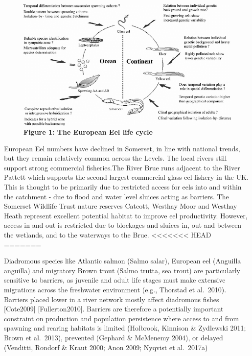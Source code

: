 \documentclass[]{article}
\begin{document}
\begin{figure}
\centering
\includegraphics{Eel-life-cycle.png}
\caption{\textbf{Figure 1: The European Eel life cycle}}
\end{figure}

European Eel numbers have declined in Somerset, in line with national
trends, but they remain relatively common across the Levels. The local
rivers still support strong commercial fisheries.The River Brue runs
adjacent to the River Pattett which supports the second largest
commercial glass eel fishery in the UK. This is thought to be primarily
due to restricted access for eels into and within the catchment - due to
flood and water level sluices acting as barriers. The Somerset Wildlife
Trust nature reserves Catcott, Westhay Moor and Westhay Heath represent
excellent potential habitat to improve eel productivity. However, access
in and out is restricted due to blockages and sluices in, out and
between the wetlands, and to the waterways to the Brue.
\textless{}\textless{}\textless{}\textless{}\textless{}\textless{}\textless{}
HEAD =======

Diadromous species like Atlantic salmon (Salmo salar), European eel
(Anguilla anguilla) and migratory Brown trout (Salmo trutta, sea trout)
are particularly sensitive to barriers, as juvenile and adult life
stages must make extensive migrations across the freshwater environment
(e.g., Thorstad et al.~2010). Barriers placed lower in a river network
mostly affect diadromous fishes {[}Cote2009{]} {[}Fullerton2010{]}.
Barriers are therefore a potentially important constraint on production
and population persistence where access to and from spawning and rearing
habitats is limited (Holbrook, Kinnison \& Zydlewski 2011; Brown et
al.~2013), prevented (Gephard \& McMenemy 2004), or delayed (Venditti,
Rondorf \& Kraut 2000; Anon 2009; Nyqvist et al.~2017a)
\end{document}
